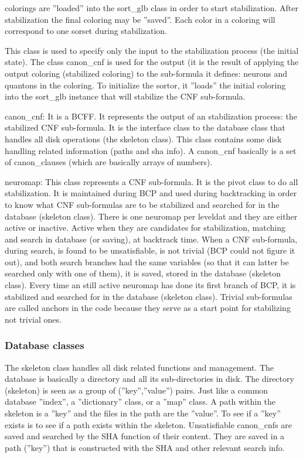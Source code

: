 \documentclass{easychair}
\newcommand{\neuron}{\textsf{neuron}}
\newcommand{\quanton}{\textsf{quanton}}
\newcommand{\leveldat}{\textsf{leveldat}}
\newcommand{\sortglb}{\textsf{sort\_glb}}
\newcommand{\sorset}{\textsf{sorset}}
\newcommand{\coloring}{\textsf{coloring}}
\newcommand{\canoncnf}{\textsf{canon\_cnf}}
\newcommand{\canonclause}{\textsf{canon\_clause}}
\newcommand{\neuromap}{\textsf{neuromap}}
\newcommand{\skeleton}{\textsf{skeleton}}
\begin{document}
{\coloring}s are ''loaded'' into the {\sortglb} class in order to start stabilization. After stabilization the final {\coloring} may be ''saved''. Each color in a coloring will correspond to one {\sorset} during stabilization.

This class is used to specify only the input to the stabilization process (the initial state). The class {\canoncnf} is used for the output (it is the result of applying the output {\coloring} (stabilized {\coloring}) to the sub-formula it defines: {\neuron}s and {\quanton}s in the {\coloring}. To initialize the sortor, it ''loads'' the initial {\coloring} into the {\sortglb} instance that will stabilize the CNF sub-formula.

{\canoncnf}: It is a BCFF. It represents the output of an stabilization process: the stabilized CNF sub-formula. It is the interface class to the database class that handles all disk operations (the {\skeleton} class). This class contains some disk handling related information (paths and sha info). A {\canoncnf} basically is a set of {\canonclause}s (which are basically arrays of numbers).

{\neuromap}: This class represents a CNF sub-formula. It is the pivot class to do all stabilization. It is maintained during BCP and used during backtracking in order to know what CNF sub-formulas are to be stabilized and searched for in the database ({\skeleton} class). There is one {\neuromap} per {\leveldat} and they are either active or inactive. Active when they are candidates for stabilization, matching and search in database (or saving), at backtrack time. When a CNF  sub-formula, during search, is found to be unsatisfiable, is not trivial (BCP could not figure it out), and both search branches had the same variables (so that it can latter be searched only with one of them), it is saved, stored in the database ({\skeleton} class). Every time an still active {\neuromap} has done its first branch of BCP, it is stabilized and searched for in the database ({\skeleton} class). Trivial sub-formulas are called anchors in the code because they serve as a start point for stabilizing not trivial ones. 

\subsubsection{Database classes}

The {\skeleton} class handles all disk related functions and management. The database is basically a directory and all its sub-directories in disk. The directory ({\skeleton}) is seen as a group of (''key'',''value'') pairs. Just like a common database ''index'', a ''dictionary'' class, or a ''map'' class. A path within the {\skeleton} is a ''key'' and the files in the path are the ''value''. To see if a ''key'' exists is to see if a path exists within the {\skeleton}. Unsatisfiable {\canoncnf}s are saved and searched by the SHA function of their content. They are saved in a path (''key'') that is constructed with the SHA and other relevant search info. 
\end{document}
